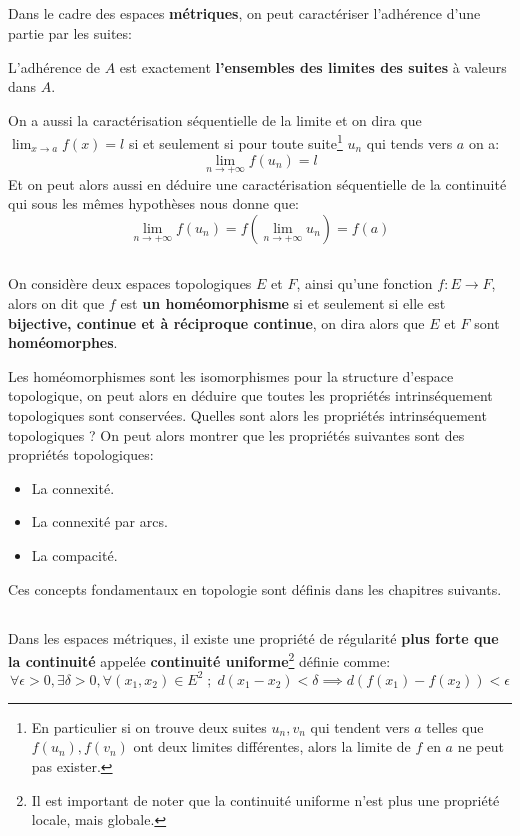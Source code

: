 \subsection*{}
Dans le cadre des espaces \textbf{métriques}, on peut caractériser l'adhérence d'une partie par les suites:
\begin{center}
   L'adhérence de \(A\) est exactement \textbf{l'ensembles des limites des suites} à valeurs dans \(A\).
\end{center}
On a aussi la caractérisation séquentielle de la limite et on dira que \(\lim_{x \rightarrow a} f(x) = l\) si et seulement si pour toute suite\footnote[1]{En particulier si on trouve deux suites \(u_n, v_n\) qui tendent vers \(a\) telles que \(f(u_n), f(v_n)\) ont deux limites différentes, alors la limite de \(f\) en \(a\) ne peut pas exister.} \(u_n\) qui tends vers \(a\) on a:
\[
   \lim_{n \rightarrow +\infty} f(u_n) = l
\]
Et on peut alors aussi en déduire une caractérisation séquentielle de la continuité qui sous les mêmes hypothèses nous donne que:
\[
   \lim_{n \rightarrow +\infty} f(u_n) = f(\lim_{n \rightarrow +\infty}u_n) = f(a)
\]
\pagebreak
\subsection*{}
On considère deux espaces topologiques \(E\) et \(F\), ainsi qu'une fonction \(f : E \longrightarrow F\), alors on dit que \(f\) est \textbf{un homéomorphisme} si et seulement si elle est \textbf{bijective, continue et à réciproque continue}, on dira alors que \(E\) et \(F\) sont \textbf{homéomorphes}.\<

Les homéomorphismes sont les isomorphismes pour la structure d'espace topologique, on peut alors en déduire que toutes les propriétés intrinséquement topologiques sont conservées. Quelles sont alors les propriétés intrinséquement topologiques ? On peut alors montrer que les propriétés suivantes sont des propriétés topologiques:
\begin{itemize}
   \item La connexité.
   \item La connexité par arcs.
   \item La compacité.
\end{itemize}
Ces concepts fondamentaux en topologie sont définis dans les chapitres suivants.
\subsection*{}
Dans les espaces métriques, il existe une propriété de régularité \textbf{plus forte que la continuité} appelée \textbf{continuité uniforme}\footnote[1]{Il est important de noter que la continuité uniforme n'est plus une propriété locale, mais globale.} définie comme:
\[
   \forall \epsilon > 0 , \exists \delta > 0 , \forall (x_1, x_2) \in E^2 \; ; \; d(x_1 - x_2) < \delta \implies d(f(x_1) - f(x_2)) < \epsilon 
\]

